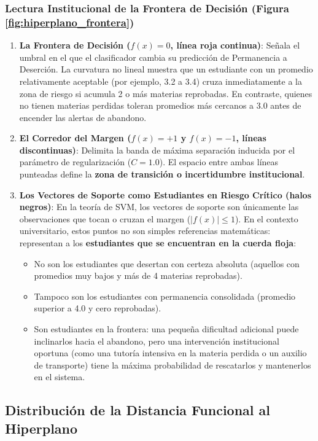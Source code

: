\documentclass[12pt,a4paper]{article}
\begin{document}
\subsubsection{Lectura Institucional de la Frontera de Decisión (Figura \ref{fig:hiperplano_frontera})}
\begin{enumerate}
    \item \textbf{La Frontera de Decisión ($f(x) = 0$, línea roja continua)}: Señala el umbral en el que el clasificador cambia su predicción de Permanencia a Deserción. La curvatura no lineal muestra que un estudiante con un promedio relativamente aceptable (por ejemplo, 3.2 a 3.4) cruza inmediatamente a la zona de riesgo si acumula 2 o más materias reprobadas. En contraste, quienes no tienen materias perdidas toleran promedios más cercanos a 3.0 antes de encender las alertas de abandono.
    \item \textbf{El Corredor del Margen ($f(x) = +1$ y $f(x) = -1$, líneas discontinuas)}: Delimita la banda de máxima separación inducida por el parámetro de regularización ($C=1.0$). El espacio entre ambas líneas punteadas define la \textbf{zona de transición o incertidumbre institucional}.
    \item \textbf{Los Vectores de Soporte como Estudiantes en Riesgo Crítico (halos negros)}: En la teoría de SVM, los vectores de soporte son únicamente las observaciones que tocan o cruzan el margen ($|f(x)| \le 1$). En el contexto universitario, estos puntos no son simples referencias matemáticas: representan a los \textbf{estudiantes que se encuentran en la cuerda floja}:
    \begin{itemize}
        \item No son los estudiantes que desertan con certeza absoluta (aquellos con promedios muy bajos y más de 4 materias reprobadas).
        \item Tampoco son los estudiantes con permanencia consolidada (promedio superior a 4.0 y cero reprobadas).
        \item Son estudiantes en la frontera: una pequeña dificultad adicional puede inclinarlos hacia el abandono, pero una intervención institucional oportuna (como una tutoría intensiva en la materia perdida o un auxilio de transporte) tiene la máxima probabilidad de rescatarlos y mantenerlos en el sistema.
    \end{itemize}
\end{enumerate}

\subsection{Distribución de la Distancia Funcional al Hiperplano}
\end{document}
